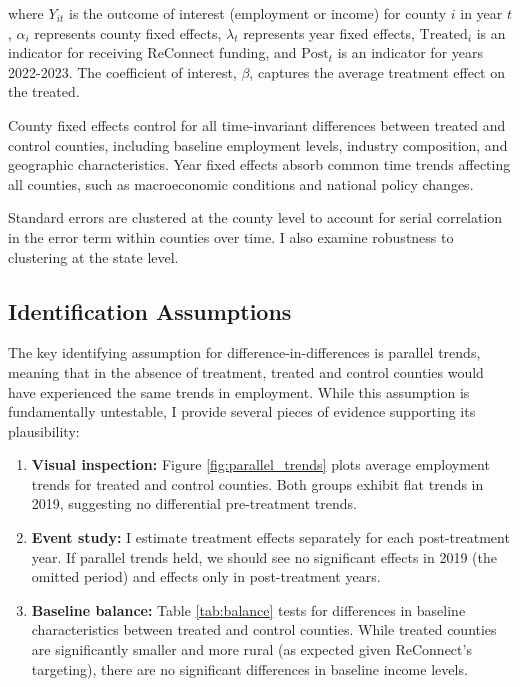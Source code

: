 \documentclass[12pt]{article}
\begin{document}
where $Y_{it}$ is the outcome of interest (employment or income) for county $i$ in year $t$, $\alpha_i$ represents county fixed effects, $\lambda_t$ represents year fixed effects, $\text{Treated}_i$ is an indicator for receiving ReConnect funding, and $\text{Post}_t$ is an indicator for years 2022-2023. The coefficient of interest, $\beta$, captures the average treatment effect on the treated.

County fixed effects control for all time-invariant differences between treated and control counties, including baseline employment levels, industry composition, and geographic characteristics. Year fixed effects absorb common time trends affecting all counties, such as macroeconomic conditions and national policy changes.

Standard errors are clustered at the county level to account for serial correlation in the error term within counties over time. I also examine robustness to clustering at the state level.

\subsection{Identification Assumptions}

The key identifying assumption for difference-in-differences is parallel trends, meaning that in the absence of treatment, treated and control counties would have experienced the same trends in employment. While this assumption is fundamentally untestable, I provide several pieces of evidence supporting its plausibility:

\begin{enumerate}
    \item \textbf{Visual inspection:} Figure \ref{fig:parallel_trends} plots average employment trends for treated and control counties. Both groups exhibit flat trends in 2019, suggesting no differential pre-treatment trends.
    
    \item \textbf{Event study:} I estimate treatment effects separately for each post-treatment year. If parallel trends held, we should see no significant effects in 2019 (the omitted period) and effects only in post-treatment years.
    
    \item \textbf{Baseline balance:} Table \ref{tab:balance} tests for differences in baseline characteristics between treated and control counties. While treated counties are significantly smaller and more rural (as expected given ReConnect's targeting), there are no significant differences in baseline income levels.
\end{enumerate}
\end{document}
